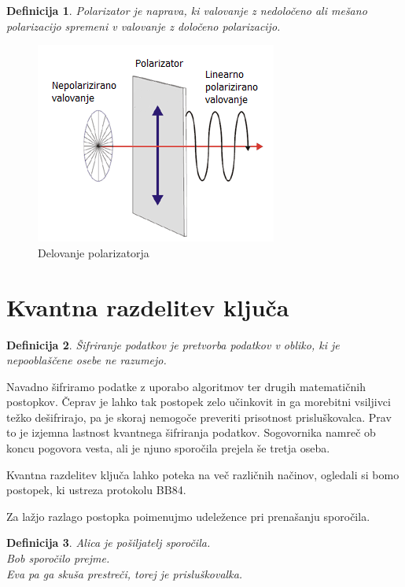 \documentclass[A4paper, 11pt]{article}
\newtheorem{definicija}{Definicija}
\begin{document}
\begin{definicija}
Polarizator je naprava, ki valovanje z nedoločeno ali mešano polarizacijo spremeni v valovanje z določeno polarizacijo.
\end{definicija}

\begin{figure}[h]
\centering
\caption{Delovanje polarizatorja}
\includegraphics[scale=0.8]{2}
\end{figure}

\pagebreak



\section{Kvantna razdelitev ključa} \label{kvantna_razdelitev}

\begin{definicija}
Šifriranje podatkov je pretvorba podatkov v obliko, ki je nepooblaščene osebe ne razumejo.
\end{definicija}

Navadno šifriramo podatke z uporabo algoritmov ter drugih matematičnih postopkov. Čeprav je lahko tak postopek zelo učinkovit in ga morebitni vsiljivci težko dešifrirajo, pa je skoraj nemogoče preveriti prisotnost prisluškovalca. Prav to je izjemna lastnost kvantnega šifriranja podatkov. Sogovornika namreč ob koncu pogovora vesta, ali je njuno sporočila prejela še tretja oseba.

Kvantna razdelitev ključa lahko poteka na več različnih načinov, ogledali si bomo postopek, ki ustreza protokolu BB84.

Za lažjo razlago postopka poimenujmo udeležence pri prenašanju sporočila.

\begin{definicija}
Alica je pošiljatelj sporočila.\\
Bob sporočilo prejme.\\
Eva pa ga skuša prestreči, torej je prisluškovalka.
\end{definicija}
\end{document}
